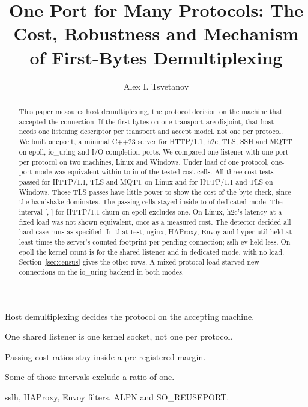 \documentclass[preprint,number]{elsarticle}
\newlength{\fulllength}
\newif\ifsubmission
\newcommand{\ForAlex}[1]{\ifsubmission\PackageWarning{main}{a ForAlex note is left in the text}\else
  \textcolor{blue}{[For Alex: #1]}\fi}
\newcommand{\oneport}{\texttt{oneport}}
\newcommand{\orcidauthorA}{0009-0001-8369-150X}
\begin{document}
\setlength{\fulllength}{\textwidth}

\begin{frontmatter}

\title{One Port for Many Protocols: The Cost, Robustness and Mechanism of First-Bytes
Demultiplexing}

\author[tu]{Alex I. Tsvetanov}
\address[tu]{Faculty of Computer Systems and Technologies, Technical University of Sofia,
ul.~Professor Georgi Bradistilov 11, Sofia, Bulgaria. ORCID \orcidauthorA.}
\fntext[phone]{\ForAlex{the corresponding author's telephone number, which Computer Communications
asks for at submission.}}

\begin{highlights}
\item Host demultiplexing decides the protocol on the accepting machine.
\item One shared listener is one kernel socket, not one per protocol.
\item Passing cost ratios stay inside a pre-registered margin.
\item Some of those intervals exclude a ratio of one.
\item sslh, HAProxy, Envoy filters, ALPN and SO\_REUSEPORT.
\end{highlights}

\begin{abstract}
This paper measures host demultiplexing, the protocol decision on the machine that accepted the
connection. If the first bytes on one transport are disjoint, that host needs one listening
descriptor per transport and accept model, not one per protocol. We built \oneport, a minimal
C++23 server for HTTP/1.1, h2c, TLS, SSH and MQTT on epoll, io\_uring and I/O completion ports.
We compared one listener with one port per protocol on two machines, Linux and Windows.
Under load of one protocol, one-port mode
was equivalent within \MarginLow{} to \MarginHigh{} in \CostPassed{} of the \CostHolm{} tested cost
cells. All three cost tests passed for HTTP/1.1, TLS and MQTT on Linux and for HTTP/1.1 and TLS on
Windows. Those TLS passes have little power to show the cost of the byte check, since the handshake
dominates. The passing cells stayed inside \MarginLow{} to \MarginHigh{} of dedicated mode. The
interval [\COneLEpollHttpLow, \COneLEpollHttpHigh] for HTTP/1.1 churn on epoll excludes one. On
Linux, h2c's latency at a fixed load was not shown equivalent, once as a measured cost. The detector
decided all \HardcaseRuns{} hard-case runs as specified. In that test, nginx,
HAProxy, Envoy and hyper-util held at least \FootprintMargin{} times the server's counted footprint
per pending connection; sslh-ev held less. On epoll the kernel count is \CensusLEpollOnePort{} for the shared listener and
\CensusLEpollDedicated{} in dedicated mode, with no load. Section~\ref{sec:census} gives the other
rows. A mixed-protocol load starved new
connections on the io\_uring backend in both modes.
\end{abstract}


\end{frontmatter}
\end{document}
